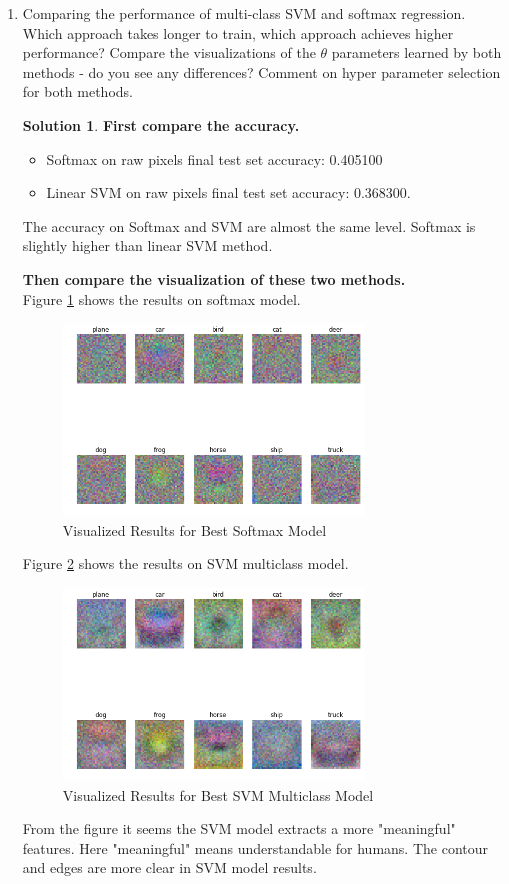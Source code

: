 \documentclass[]{book}
\theoremstyle{definition}
\newtheorem*{soln}{Solution}
\begin{document}
\begin{enumerate}
	
	\item Comparing the performance of multi-class SVM and softmax regression. Which approach takes longer to train, which approach achieves higher performance? Compare the visualizations of the $\theta$ parameters learned by both methods - do you see any differences? Comment on hyper parameter selection for both methods.
	\begin{soln}
		\textbf{First compare the accuracy.}
		\begin{itemize}  
			\item Softmax on raw pixels final test set accuracy: 0.405100
			\item Linear SVM on raw pixels final test set accuracy: 0.368300.
		\end{itemize}
		The accuracy on Softmax and SVM are almost the same level. Softmax is slightly higher than linear SVM method.
		
		\textbf{Then compare the visualization of these two methods.}\\
		Figure \ref{fig:softmax} shows the results on softmax model.
		\begin{figure}[H]
			\centering
			\includegraphics[width=8cm]{softmax_res.png}
			\caption{Visualized Results for Best Softmax Model}
			\label{fig:softmax}
		\end{figure}
		Figure \ref{fig:SVM} shows the results on SVM multiclass model.
		\begin{figure}[H]
			\centering
			\includegraphics[width=8cm]{multiSVM_final.png}
			\caption{Visualized Results for Best SVM Multiclass Model}
			\label{fig:SVM}
		\end{figure}
		From the figure it seems the SVM model extracts a more "meaningful" features. Here "meaningful" means understandable for humans. The contour and edges are more clear in SVM model results.
		

\end{soln}
\end{enumerate}
\end{document}
